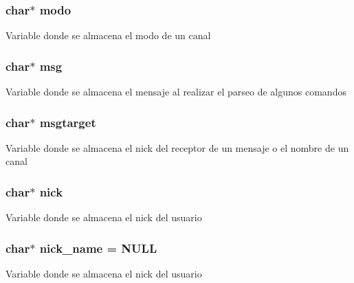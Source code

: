 \subsubsection[{modo}]{\setlength{\rightskip}{0pt plus 5cm}char$\ast$ modo}\label{_g-2361-06-_p1-_server_8c_a7451f0d59207b53af6178219fcf62677}
Variable donde se almacena el modo de un canal \hypertarget{_g-2361-06-_p1-_server_8c_a32d2f5216cddb59c7cc8fb2806a7e727}{}
\subsubsection[{msg}]{\setlength{\rightskip}{0pt plus 5cm}char$\ast$ msg}\label{_g-2361-06-_p1-_server_8c_a32d2f5216cddb59c7cc8fb2806a7e727}
Variable donde se almacena el mensaje al realizar el parseo de algunos comandos \hypertarget{_g-2361-06-_p1-_server_8c_a968dcc7e43caeca7959f3c069dcccc6a}{}
\subsubsection[{msgtarget}]{\setlength{\rightskip}{0pt plus 5cm}char$\ast$ msgtarget}\label{_g-2361-06-_p1-_server_8c_a968dcc7e43caeca7959f3c069dcccc6a}
Variable donde se almacena el nick del receptor de un mensaje o el nombre de un canal \hypertarget{_g-2361-06-_p1-_server_8c_a89f27568c92a418413e6b37b41f07e21}{}
\subsubsection[{nick}]{\setlength{\rightskip}{0pt plus 5cm}char$\ast$ nick}\label{_g-2361-06-_p1-_server_8c_a89f27568c92a418413e6b37b41f07e21}
Variable donde se almacena el nick del usuario \hypertarget{_g-2361-06-_p1-_server_8c_aabbf66718cda228b924a4a9441eadf62}{}
\subsubsection[{nick\+\_\+name}]{\setlength{\rightskip}{0pt plus 5cm}char$\ast$ nick\+\_\+name = N\+U\+L\+L}\label{_g-2361-06-_p1-_server_8c_aabbf66718cda228b924a4a9441eadf62}
Variable donde se almacena el nick del usuario \hypertarget{_g-2361-06-_p1-_server_8c_ac9a5ec6f534d2a8e2a870179807d32dc}{}
